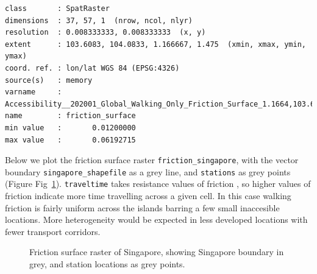 \documentclass[
  10pt,
  letterpaper,
]{article}
\begin{document}
\begin{verbatim}
class       : SpatRaster 
dimensions  : 37, 57, 1  (nrow, ncol, nlyr)
resolution  : 0.008333333, 0.008333333  (x, y)
extent      : 103.6083, 104.0833, 1.166667, 1.475  (xmin, xmax, ymin, ymax)
coord. ref. : lon/lat WGS 84 (EPSG:4326) 
source(s)   : memory
varname     : Accessibility__202001_Global_Walking_Only_Friction_Surface_1.1664,103.6091,1.4714,104.0858 
name        : friction_surface 
min value   :       0.01200000 
max value   :       0.06192715 
\end{verbatim}

Below we plot the friction surface raster \texttt{friction\_singapore},
with the vector boundary \texttt{singapore\_shapefile} as a grey line,
and \texttt{stations} as grey points (Figure Fig~\ref{fig-data}).
\texttt{traveltime} takes resistance values of friction
\citep{gdistance2017}, so higher values of friction indicate more time
travelling across a given cell. In this case walking friction is fairly
uniform across the islands barring a few small inaccesible locations.
More heterogeneity would be expected in less developed locations with
fewer transport corridors.

\begin{figure}


\caption{\label{fig-data}Friction surface raster of Singapore, showing
Singapore boundary in grey, and station locations as grey points.}

\end{figure}%
\end{document}
